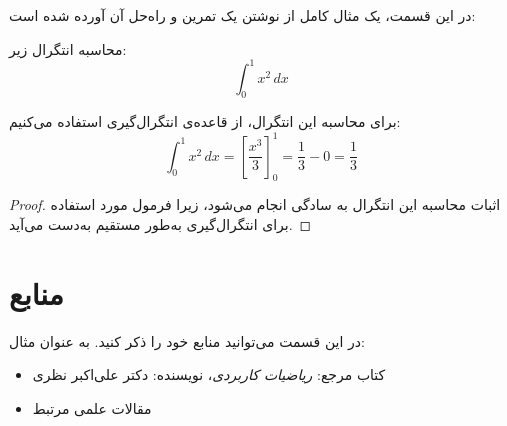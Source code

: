 در این قسمت، یک مثال کامل از نوشتن یک تمرین و راه‌حل آن آورده شده است:

\begin{prob}
    محاسبه انتگرال زیر:
    \[
        \int_{0}^{1} x^2 \, dx
    \]
\end{prob}

\begin{sol}
    برای محاسبه این انتگرال، از قاعده‌ی انتگرال‌گیری استفاده می‌کنیم:
    \[
        \int_{0}^{1} x^2 \, dx = \left[ \frac{x^3}{3} \right]_{0}^{1} = \frac{1}{3} - 0 = \frac{1}{3}
    \]
\end{sol}

\begin{proof}
    اثبات محاسبه این انتگرال به سادگی انجام می‌شود، زیرا فرمول مورد استفاده برای انتگرال‌گیری به‌طور مستقیم به‌دست می‌آید.
\end{proof}

\newpage

\section*{منابع}
در این قسمت می‌توانید منابع خود را ذکر کنید. به عنوان مثال:

\begin{itemize}
    \item کتاب مرجع: \textit{ریاضیات کاربردی}، نویسنده: دکتر علی‌اکبر نظری
    \item مقالات علمی مرتبط
\end{itemize}